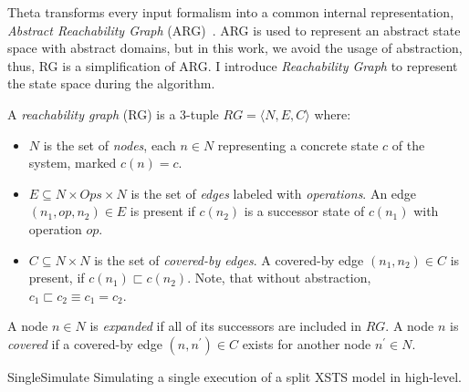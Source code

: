 Theta transforms every input formalism into a common internal representation, \emph{Abstract Reachability Graph} (ARG)~\cite{theta-arg}. ARG is used to represent an abstract state space with abstract domains, but in this work, we avoid the usage of abstraction, thus, RG is a simplification of ARG. I introduce \emph{Reachability Graph} to represent the state space during the algorithm.

\begin{definition}
A \emph{reachability graph} (RG) is a 3-tuple $RG = \langle N, E, C \rangle$ where:
\begin{itemize}
    \item $N$ is the set of \emph{nodes}, each $n \in N$ representing a concrete state $c$ of the system, marked $c(n) = c$.
    \item $E \subseteq N \times Ops \times N$ is the set of \emph{edges} labeled with \emph{operations}. An edge $(n_1, op, n_2) \in E$ is present if $c(n_2)$ is a successor state of $c(n_1)$ with operation $op$.
    \item $C \subseteq N \times N$ is the set of \emph{covered-by edges}. A covered-by edge $(n_1, n_2) \in C$ is present, if $c(n_1) \sqsubset c(n_2)$. Note, that without abstraction, $c_1 \sqsubset c_2 \equiv c_1 = c_2$.
\end{itemize}
\end{definition}

A node $n \in N$ is \emph{expanded} if all of its successors are included in $RG$. A node $n$ is \emph{covered} if a covered-by edge $(n, n^\prime) \in C$ exists for another node $n^\prime \in N$. 

\begin{algorithm}[ht]
\DontPrintSemicolon
\caption{{\sc SingleSimulate} Simulating a single execution of a split XSTS model in high-level.} \label{alg:sim-basic}

\end{algorithm}

